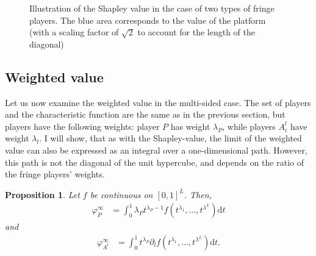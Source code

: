 \documentclass[a4paper]{article}
\newtheorem{proposition}{Proposition}
\newcommand{\dt}{\mathrm{d}t}
\begin{document}
\begin{figure}
    \centering
    \caption{Illustration of the Shapley value in the case of two types of fringe players. The blue area corresponds to the value of the platform (with a scaling factor of $\sqrt{2}$ to account for the length of the diagonal)}
    \label{fig:many_sided_shapley}
\end{figure}


\subsection{Weighted value}

Let us now examine the weighted value in the multi-sided case.
The set of players and the characteristic function are the same as in the previous section, but players have the following weights: player $P$ has weight $\lambda_P$, while players $A^l_i$ have weight $\lambda_l$.
I will show, that as with the Shapley-value, the limit of the weighted value can also be expressed as an integral over a one-dimensional path.
However, this path is not the diagonal of the unit hypercube, and depends on the ratio of the fringe players' weights.

\begin{proposition}
    \label{prop:many_sided_weighted}
    Let $f$ be continuous on $[0, 1]^L$.
    Then,
    \begin{align*}
        \varphi_P^\infty & = \int_0^1 \lambda_P t^{\lambda_P - 1} f(t^{\lambda_1}, \dots, t^{\lambda^L}) \dt
    \end{align*}
    and
    \begin{align*}
        \varphi_{A^l}^\infty & = \int_0^1 t^{\lambda_P} \partial_l f(t^{\lambda_1}, \dots, t^{\lambda^L}) \dt.
    \end{align*}
\end{proposition}
\end{document}
